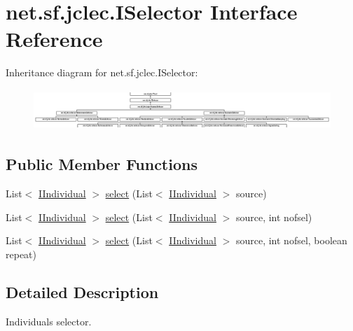 \hypertarget{interfacenet_1_1sf_1_1jclec_1_1_i_selector}{\section{net.\-sf.\-jclec.\-I\-Selector Interface Reference}
\label{interfacenet_1_1sf_1_1jclec_1_1_i_selector}
}
Inheritance diagram for net.\-sf.\-jclec.\-I\-Selector\-:\begin{figure}[H]
\begin{center}
\leavevmode
\includegraphics[height=1.543408cm]{interfacenet_1_1sf_1_1jclec_1_1_i_selector}
\end{center}
\end{figure}
\subsection*{Public Member Functions}
\begin{DoxyCompactItemize}
\item 
List$<$ \hyperlink{interfacenet_1_1sf_1_1jclec_1_1_i_individual}{I\-Individual} $>$ \hyperlink{interfacenet_1_1sf_1_1jclec_1_1_i_selector_a271fa45c6619e39126b64d0d7db83d17}{select} (List$<$ \hyperlink{interfacenet_1_1sf_1_1jclec_1_1_i_individual}{I\-Individual} $>$ source)
\item 
List$<$ \hyperlink{interfacenet_1_1sf_1_1jclec_1_1_i_individual}{I\-Individual} $>$ \hyperlink{interfacenet_1_1sf_1_1jclec_1_1_i_selector_a40ef927639aa3cf51b1ffe4bb43e0fde}{select} (List$<$ \hyperlink{interfacenet_1_1sf_1_1jclec_1_1_i_individual}{I\-Individual} $>$ source, int nofsel)
\item 
List$<$ \hyperlink{interfacenet_1_1sf_1_1jclec_1_1_i_individual}{I\-Individual} $>$ \hyperlink{interfacenet_1_1sf_1_1jclec_1_1_i_selector_ac2447d10f2f8164df4f4c94c12db3751}{select} (List$<$ \hyperlink{interfacenet_1_1sf_1_1jclec_1_1_i_individual}{I\-Individual} $>$ source, int nofsel, boolean repeat)
\end{DoxyCompactItemize}


\subsection{Detailed Description}
Individuals selector.

